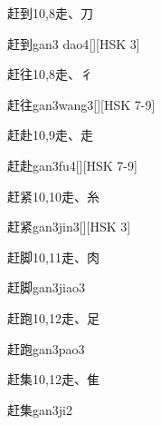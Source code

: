 \begin{Entry}{赶到}{10,8}{⾛、⼑}
  \begin{Phonetics}{赶到}{gan3 dao4}[][HSK 3]
  \end{Phonetics}
\end{Entry}

\begin{Entry}{赶往}{10,8}{⾛、⼻}
  \begin{Phonetics}{赶往}{gan3wang3}[][HSK 7-9]
  \end{Phonetics}
\end{Entry}

\begin{Entry}{赶赴}{10,9}{⾛、⾛}
  \begin{Phonetics}{赶赴}{gan3fu4}[][HSK 7-9]
  \end{Phonetics}
\end{Entry}

\begin{Entry}{赶紧}{10,10}{⾛、⽷}
  \begin{Phonetics}{赶紧}{gan3jin3}[][HSK 3]
  \end{Phonetics}
\end{Entry}

\begin{Entry}{赶脚}{10,11}{⾛、⾁}
  \begin{Phonetics}{赶脚}{gan3jiao3}
  \end{Phonetics}
\end{Entry}

\begin{Entry}{赶跑}{10,12}{⾛、⾜}
  \begin{Phonetics}{赶跑}{gan3pao3}
  \end{Phonetics}
\end{Entry}

\begin{Entry}{赶集}{10,12}{⾛、⾫}
  \begin{Phonetics}{赶集}{gan3ji2}
  \end{Phonetics}
\end{Entry}

